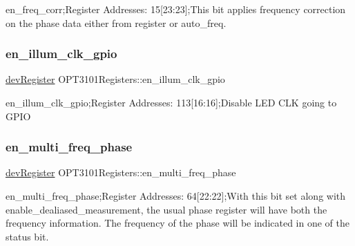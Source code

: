 en\+\_\+freq\+\_\+corr;Register Addresses\+: 15\mbox{[}23\+:23\mbox{]};This bit applies frequency correction on the phase data either from register or auto\+\_\+freq. 

\mbox{\label{class_o_p_t3101_registers_ae4e24dda1b61159e4352356d589478e6}} 
\subsubsection{\texorpdfstring{en\+\_\+illum\+\_\+clk\+\_\+gpio}{en\_illum\_clk\_gpio}}
{\footnotesize\ttfamily \mbox{\hyperlink{classdev_register}{dev\+Register}} O\+P\+T3101\+Registers\+::en\+\_\+illum\+\_\+clk\+\_\+gpio}



en\+\_\+illum\+\_\+clk\+\_\+gpio;Register Addresses\+: 113\mbox{[}16\+:16\mbox{]};Disable L\+ED C\+LK going to G\+P\+IO 

\mbox{\label{class_o_p_t3101_registers_aadad890efb400dc11a81714a167f0fb9}} 
\subsubsection{\texorpdfstring{en\+\_\+multi\+\_\+freq\+\_\+phase}{en\_multi\_freq\_phase}}
{\footnotesize\ttfamily \mbox{\hyperlink{classdev_register}{dev\+Register}} O\+P\+T3101\+Registers\+::en\+\_\+multi\+\_\+freq\+\_\+phase}



en\+\_\+multi\+\_\+freq\+\_\+phase;Register Addresses\+: 64\mbox{[}22\+:22\mbox{]};With this bit set along with enable\+\_\+dealiased\+\_\+measurement, the usual phase register will have both the frequency information. The frequency of the phase will be indicated in one of the status bit. 

\mbox{\label{class_o_p_t3101_registers_a64d96f648b7c2cdef2ad7152722db402}} 
